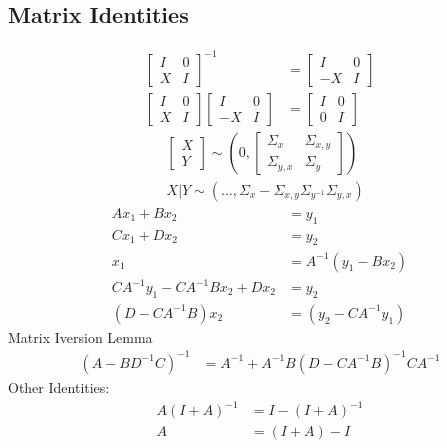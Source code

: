 \documentclass{article}
\begin{document}
\subsection{Matrix Identities}
\begin{align*}
\begin{bmatrix} I & 0 \\ X & I \end{bmatrix} ^{-1} &= \begin{bmatrix} I & 0 \\ -X & I \end{bmatrix}
\\ \begin{bmatrix} I & 0 \\ X & I \end{bmatrix} \begin{bmatrix} I & 0 \\ -X & I \end{bmatrix} &= \begin{bmatrix} I & 0 \\ 0 & I \end{bmatrix}
\end{align*}
\begin{align*}
&\begin{bmatrix} X \\ Y \end{bmatrix} \sim  \left(0, \begin{bmatrix} \Sigma_{x} & \Sigma_{x,y} \\ \Sigma_{y,x} & \Sigma_{y} \end{bmatrix}\right)
\\ &X  | Y \sim  \left(..., \Sigma_{x} - \Sigma_{x,y} \Sigma_{y^{-1}} \Sigma_{y,x}\right)
\end{align*}
\begin{align*}
A  x_{1} + B x_{2} &= y_{1}
\\ C  x_{1} + D x_{2} &= y_{2}
\\ x_{1} &= A^{-1}\left(y_{1} - B x_{2}\right)
\\ C  A^{-1} y_{1} - C A^{-1} B x_{2} + D x_{2} &= y_{2}
\\ \left(D  - C A^{-1} B\right) x_{2} &= \left(y_{2} - C A^{-1} y_{1}\right)
\end{align*}
Matrix Iversion Lemma
\begin{align*}
\left(A  - B D^{-1} C\right)^{-1} &= A^{-1} + A^{-1} B \left(D - C A^{-1} B\right)^{-1} C A^{-1}
\end{align*}
Other Identities:
\begin{align*}
A  \left(I + A\right)^{-1} &= I - \left(I + A\right)^{-1}
\\ A  &= \left(I + A\right) - I 
\end{align*}
\end{document}
